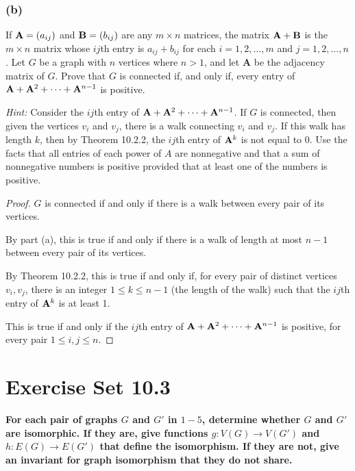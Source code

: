 \documentclass[14pt]{extarticle}
\newcommand{\cy}{\color{cyan}}
\begin{document}
\subsubsection{(b)}
If \({\bf A} = (a_{ij})\) and \({\bf B} = (b_{ij})\) are any \(m \times n\) matrices, the matrix \({\bf A} + {\bf B}\) is
the \(m \times n\) matrix whose \(ij\)th entry is \(a_{ij} + b_{ij}\) for each \(i = 1, 2, \ldots, m\) and \(j = 1, 2,
\ldots, n\). Let \(G\) be a graph with \(n\) vertices where \(n > 1\), and let {\bf A} be the adjacency matrix of \(G\).
Prove that \(G\) is connected if, and only if, every entry of \({\bf A} + {\bf A}^2 + \cdots + {\bf A}^{n-1}\) is positive.

    {\it Hint:} Consider the \(ij\)th entry of \({\bf A} + {\bf A}^2 + \cdots + {\bf A}^{n-1}\). If \(G\) is connected, then
given the vertices \(v_i\) and \(v_j\), there is a walk connecting \(v_i\) and \(v_j\). If this walk has length \(k\),
then by Theorem 10.2.2, the \(ij\)th entry of \({\bf A}^k\) is not equal to 0. Use the facts that all entries of each power
of \(A\) are nonnegative and that a sum of nonnegative numbers is positive provided that at least one of the numbers is
positive.

\begin{proof}
    \(G\) is connected if and only if there is a walk between every pair of its vertices.

    By part (a), this is true if and only if there is a walk of length at most \(n-1\) between every pair of its vertices.

    By Theorem 10.2.2, this is true if and only if, for every pair of distinct vertices \(v_i, v_j\), there is an integer
    \(1 \leq k \leq n-1\) (the length of the walk) such that the \(ij\)th entry of \({\bf A}^k\) is at least 1.

    This is true if and only if the \(ij\)th entry of \({\bf A} + {\bf A}^2 + \cdots + {\bf A}^{n-1}\) is positive, for every
    pair \(1 \leq i,j \leq n\).
\end{proof}

\section{Exercise Set 10.3}
 {\bf \cy For each pair of graphs \(G\) and \(G'\) in \(1-5\), determine whether \(G\) and \(G'\) are isomorphic. If they
  are, give functions \(g: V(G) \to V(G')\) and \(h: E(G) \to E(G')\) that define the isomorphism. If they are not, give an
  invariant for graph isomorphism that they do not share.}
\end{document}
